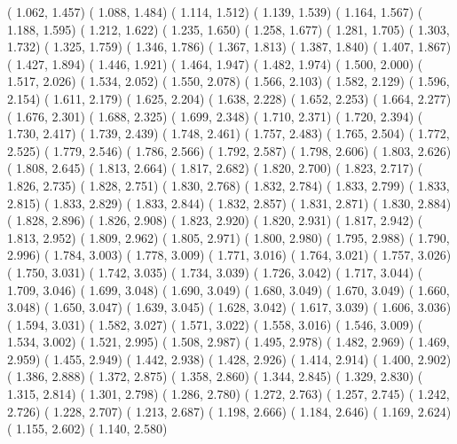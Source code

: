 {  (  1.062,   1.457)  (  1.088,   1.484)  (  1.114,   1.512)  (  1.139,   1.539)  (  1.164,   1.567)
  (  1.188,   1.595)  (  1.212,   1.622)  (  1.235,   1.650)  (  1.258,   1.677)  (  1.281,   1.705)
  (  1.303,   1.732)  (  1.325,   1.759)  (  1.346,   1.786)  (  1.367,   1.813)  (  1.387,   1.840)
  (  1.407,   1.867)  (  1.427,   1.894)  (  1.446,   1.921)  (  1.464,   1.947)  (  1.482,   1.974)
  (  1.500,   2.000)  (  1.517,   2.026)  (  1.534,   2.052)  (  1.550,   2.078)  (  1.566,   2.103)
  (  1.582,   2.129)  (  1.596,   2.154)  (  1.611,   2.179)  (  1.625,   2.204)  (  1.638,   2.228)
  (  1.652,   2.253)  (  1.664,   2.277)  (  1.676,   2.301)  (  1.688,   2.325)  (  1.699,   2.348)
  (  1.710,   2.371)  (  1.720,   2.394)  (  1.730,   2.417)  (  1.739,   2.439)  (  1.748,   2.461)
  (  1.757,   2.483)  (  1.765,   2.504)  (  1.772,   2.525)  (  1.779,   2.546)  (  1.786,   2.566)
  (  1.792,   2.587)  (  1.798,   2.606)  (  1.803,   2.626)  (  1.808,   2.645)  (  1.813,   2.664)
  (  1.817,   2.682)  (  1.820,   2.700)  (  1.823,   2.717)  (  1.826,   2.735)  (  1.828,   2.751)
  (  1.830,   2.768)  (  1.832,   2.784)  (  1.833,   2.799)  (  1.833,   2.815)  (  1.833,   2.829)
  (  1.833,   2.844)  (  1.832,   2.857)  (  1.831,   2.871)  (  1.830,   2.884)  (  1.828,   2.896)
  (  1.826,   2.908)  (  1.823,   2.920)  (  1.820,   2.931)  (  1.817,   2.942)  (  1.813,   2.952)
  (  1.809,   2.962)  (  1.805,   2.971)  (  1.800,   2.980)  (  1.795,   2.988)  (  1.790,   2.996)
  (  1.784,   3.003)  (  1.778,   3.009)  (  1.771,   3.016)  (  1.764,   3.021)  (  1.757,   3.026)
  (  1.750,   3.031)  (  1.742,   3.035)  (  1.734,   3.039)  (  1.726,   3.042)  (  1.717,   3.044)
  (  1.709,   3.046)  (  1.699,   3.048)  (  1.690,   3.049)  (  1.680,   3.049)  (  1.670,   3.049)
  (  1.660,   3.048)  (  1.650,   3.047)  (  1.639,   3.045)  (  1.628,   3.042)  (  1.617,   3.039)
  (  1.606,   3.036)  (  1.594,   3.031)  (  1.582,   3.027)  (  1.571,   3.022)  (  1.558,   3.016)
  (  1.546,   3.009)  (  1.534,   3.002)  (  1.521,   2.995)  (  1.508,   2.987)  (  1.495,   2.978)
  (  1.482,   2.969)  (  1.469,   2.959)  (  1.455,   2.949)  (  1.442,   2.938)  (  1.428,   2.926)
  (  1.414,   2.914)  (  1.400,   2.902)  (  1.386,   2.888)  (  1.372,   2.875)  (  1.358,   2.860)
  (  1.344,   2.845)  (  1.329,   2.830)  (  1.315,   2.814)  (  1.301,   2.798)  (  1.286,   2.780)
  (  1.272,   2.763)  (  1.257,   2.745)  (  1.242,   2.726)  (  1.228,   2.707)  (  1.213,   2.687)
  (  1.198,   2.666)  (  1.184,   2.646)  (  1.169,   2.624)  (  1.155,   2.602)  (  1.140,   2.580)
}
